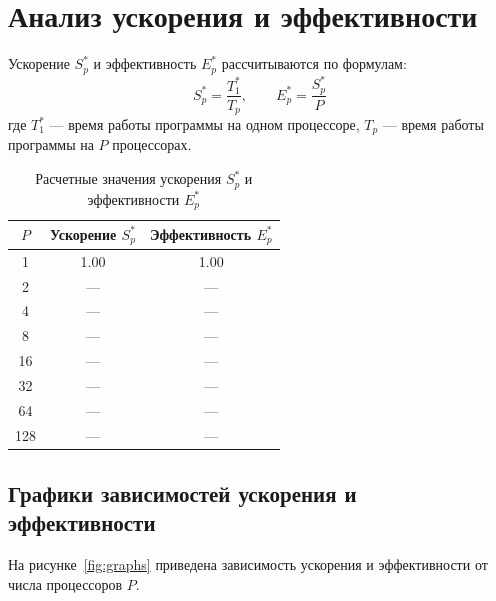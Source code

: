 	\section{Анализ ускорения и эффективности}
	Ускорение $S_p^*$ и эффективность $E_p^*$ рассчитываются по формулам:
	\[
	S_p^* = \frac{T_1^*}{T_p}, \qquad E_p^* = \frac{S_p^*}{P}
	\]
	где $T_1^*$ — время работы программы на одном процессоре, $T_p$ — время работы программы на $P$ процессорах.
	
	\begin{table}[H]
		\centering
		\begin{tabular}{|c|c|c|}
			\hline
			$P$ & {Ускорение $S_p^*$} & Эффективность $E_p^*$ \\ \hline
			1   & 1.00 & 1.00 \\ \hline
			2   & ---  & ---  \\ \hline
			4   & ---  & ---  \\ \hline
			8   & ---  & ---  \\ \hline
			16  & ---  & ---  \\ \hline
			32  & ---  & ---  \\ \hline
			64  & ---  & ---  \\ \hline
			128 & ---  & ---  \\ \hline
		\end{tabular}
		\caption{Расчетные значения ускорения $S_p^*$ и эффективности $E_p^*$}
		\label{tab:speedup_eff}
	\end{table}
	
	\subsection{Графики зависимостей ускорения и эффективности}
	
	На рисунке~\ref{fig:graphs} приведена зависимость ускорения и эффективности от числа процессоров $P$.
	
